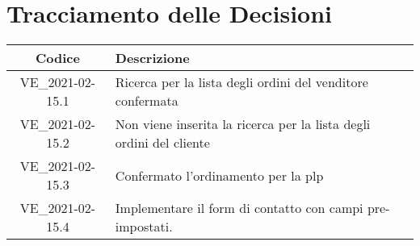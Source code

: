 \section*{Tracciamento delle Decisioni}

\begin{center}
	\begin{longtable}{|c|p{11.5cm}|}
	\hline
	\rowcolor{lighter-grayer}
	\textbf{Codice} & \textbf{Descrizione} \\
	\hline
	\endfirsthead

	\hline
	VE\_2021-02-15.1 & Ricerca per la lista degli ordini del venditore confermata \\
	VE\_2021-02-15.2 & Non viene inserita la ricerca per la lista degli ordini del cliente \\
	VE\_2021-02-15.3 & Confermato l'ordinamento per la plp \\
	VE\_2021-02-15.4 & Implementare il form di contatto con campi pre-impostati. \\
	\hline

	\end{longtable}
\end{center}